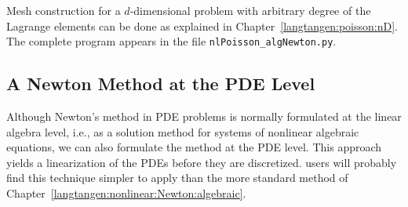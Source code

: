Mesh construction for a $d$-dimensional problem with arbitrary degree of
the Lagrange elements can be done as
explained in Chapter~\ref{langtangen:poisson:nD}.
The complete program appears in the file {\fontsize{12pt}{12pt}\verb!nlPoisson_algNewton.py!}.


\subsection{A Newton Method at the PDE Level}
\label{langtangen:nonlinear:Newton:pdelevel}

Although Newton's method in PDE problems is normally formulated at the
linear algebra level, i.e., as a solution method for systems of nonlinear
algebraic equations, we can also formulate the method at the PDE level.
This approach yields a linearization of the PDEs before they are discretized.
\fenics{} users will probably find this technique simpler to apply than
the more standard method of Chapter~\ref{langtangen:nonlinear:Newton:algebraic}.

